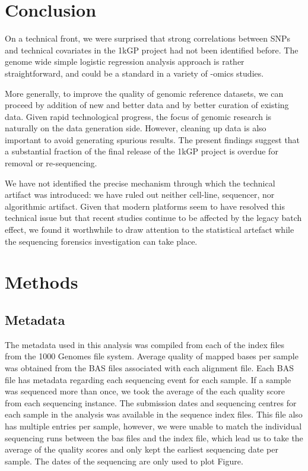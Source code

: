 \documentclass[9pt,lineno]{elife}
\begin{document}
\section{Conclusion}

On a technical front, we were surprised that strong correlations between SNPs and technical covariates in the 1kGP project had not been identified before. 
The genome wide simple logistic regression analysis approach is rather straightforward, and could be a standard in a variety of -omics studies. 

More generally, to improve the quality of genomic reference datasets, we can proceed by addition of new and better data and by better curation of existing data.
Given rapid technological progress, the focus of genomic research is naturally on the data generation side. However, cleaning up data is also important to avoid generating spurious results. 
The present findings suggest that a substantial fraction of the final release of the 1kGP project is overdue for removal or re-sequencing. 

We have not identified the precise mechanism through which the technical artifact was introduced: we have ruled out neither cell-line, sequencer, nor algorithmic artifact. 
Given that modern platforms seem to have resolved this technical issue but that recent studies continue to be affected by the legacy batch effect, we found it worthwhile to draw attention to the statistical artefact while the sequencing forensics investigation can take place.     


\section{Methods}
\subsection{Metadata}
The metadata used in this analysis was compiled from each of the index files from the 1000 Genomes file system. 
Average quality of mapped bases per sample was obtained from the BAS files associated with each alignment file. 
Each BAS file has metadata regarding each sequencing event for each sample. 
If a sample was sequenced more than once, we took the average of the each quality score from each sequencing instance. 
The submission dates and sequencing centres for each sample in the analysis was available in the sequence index files.  
This file also has multiple entries per sample, however, we were unable to match the individual sequencing runs between the bas files and the index file, which lead us to take the average of the quality scores and only kept the earliest sequencing date per sample. 
The dates of the sequencing are only used to plot Figure.
\end{document}
